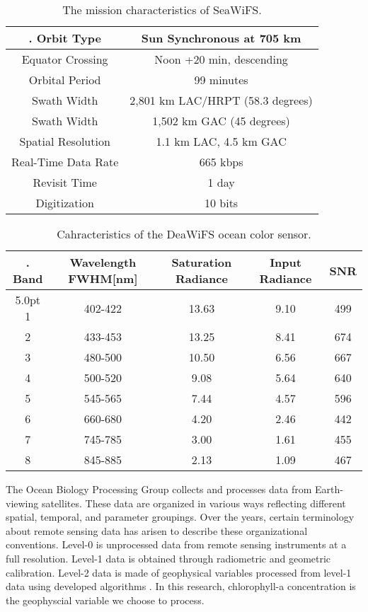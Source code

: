 \begin{table}[h]%
 	\caption{The mission characteristics of SeaWiFS.}
 	\label{table01}
 	\centering
 	\begin{tabular}{c|c}
 		\hline \setlength{\arrayrulewidth}{0.8pt}. 
 	Orbit Type	& Sun Synchronous at 705 km \\ \hline
 	Equator Crossing &	Noon +20 min, descending \\ \hline
 	Orbital Period &	99 minutes  \\ \hline
 	Swath Width &	2,801 km LAC/HRPT (58.3 degrees)  \\ \hline
 	Swath Width &	1,502 km GAC (45 degrees)  \\ \hline
 	Spatial Resolution &	1.1 km LAC, 4.5 km GAC  \\ \hline
 	Real-Time Data Rate &	665 kbps  \\ \hline
 	Revisit Time &	1 day  \\ \hline
 	Digitization &	10 bits  \\ \hline
 	\end{tabular}
 \end{table}

 \begin{table}[h]%
	\caption{Cahracteristics of the DeaWiFS ocean color sensor.}
	\label{table02}
	\centering
	\begin{tabular}{c|c|c|c|c}
		\hline \setlength{\arrayrulewidth}{0.8pt}. 
		Band	& Wavelength FWHM[nm] & Saturation Radiance & Input Radiance & SNR\\ \hline{5.0pt}
		1 & 402-422 & 13.63 & 9.10 & 499 \\ \hline
		2 & 433-453 & 13.25 & 8.41 & 674  \\ \hline
		3 & 480-500 & 10.50 & 6.56 & 667 \\ \hline
		4 & 500-520 & 9.08 & 5.64 & 640  \\ \hline
		5 & 545-565 & 7.44 & 4.57 & 596 \\ \hline
		6 & 660-680 & 4.20 & 2.46 & 442  \\ \hline
		7 & 745-785 & 3.00 & 1.61 & 455 \\ \hline
		8 & 845-885 & 2.13 & 1.09 & 467  \\ \hline
	\end{tabular}
\end{table}
 
 The Ocean Biology Processing Group collects and processes data from Earth-viewing satellites. These data are organized in various ways reflecting different spatial, temporal, and parameter groupings. Over the years, certain terminology about remote sensing data has arisen to describe these organizational conventions. Level-0 is unprocessed data from remote sensing instruments at a full resolution. Level-1 data is obtained through radiometric and geometric calibration. Level-2 data is made of geophysical variables processed from level-1 data using developed algorithms \cite{feldman2017ocean}. In this research, chlorophyll-a concentration is the geophyscial variable we choose to process.


